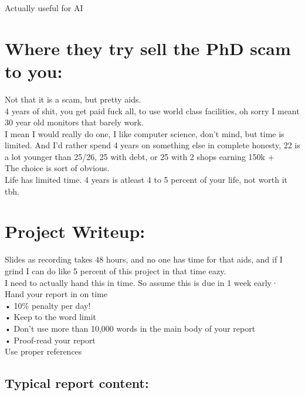\documentclass [12pt]{article}
\begin{document}
Actually useful for AI\\

\section{Where they try sell the PhD scam to you:}

Not that it is a scam, but pretty aids.\\ 
4 years of shit, you get paid fuck all, to use world class facilities, oh sorry I meant 30 year old monitors that barely work.\\ 

I mean I would really do one, I like computer science, don't mind, but time is limited. And I'd rather spend 4 years on something else in complete honesty, 22 is a lot younger than 25/26, 25 with debt, or 25 with 2 shops earning 150k + \\ 

The choice is sort of obvious.\\ 

Life has limited time. 4 years is atleast 4 to 5 percent of your life, not worth it tbh.\\ 

\section{Project Writeup:}

Slides as recording takes 48 hours, and no one has time for that aids, and if I grind I can do like 5 percent of this project in that time eazy.\\ 

I need to actually hand this in time. So assume this is due in 1 week early·\\ 

 Hand your report in on time\\
• 10\% penalty per day!\\
• Keep to the word limit\\
• Don’t use more than 10,000 words in the main body of your report\\
• Proof-read your report\\

Use proper references\\

\subsection{Typical report content:}
\end{document}
